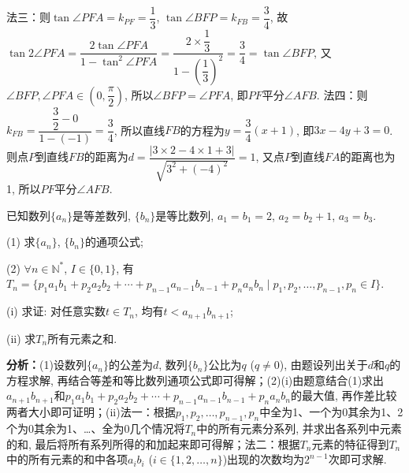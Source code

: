 \begin{question}[points=15]
\begin{solution}
法三：则$\tan\angle PFA = k_{PF} = \dfrac{1}{3}$, $\tan\angle BFP = k_{FB} = \dfrac{3}{4}$, 故$\tan 2\angle PFA = \dfrac{2\tan\angle PFA}{1 - \tan^2\angle PFA} = \dfrac{2 \times \dfrac{1}{3}}{1 - \left(\dfrac{1}{3}\right)^2} = \dfrac{3}{4} = \tan\angle BFP$, 又$\angle BFP, \angle PFA \in (0, \dfrac{\pi}{2})$, 所以$\angle BFP = \angle PFA$, 即$PF$平分$\angle AFB$.
法四：则$k_{FB} = \dfrac{\dfrac{3}{2} - 0}{1 - (-1)} = \dfrac{3}{4}$, 所以直线$FB$的方程为$y = \dfrac{3}{4}(x+1)$, 即$3x - 4y + 3 = 0$. 则点$P$到直线$FB$的距离为$d = \dfrac{|3 \times 2 - 4 \times 1 + 3|}{\sqrt{3^2 + (-4)^2}} = 1$, 又点$P$到直线$FA$的距离也为1, 所以$PF$平分$\angle AFB$.
\end{solution}
\end{question}

\begin{question}[points=15]
已知数列$\{a_n\}$是等差数列, $\{b_n\}$是等比数列, $a_1 = b_1 = 2$, $a_2 = b_2 + 1$, $a_3 = b_3$.

(1) 求$\{a_n\}$, $\{b_n\}$的通项公式;

(2) $\forall n \in \mathbb{N}^*$, $I \in \{0,1\}$, 有$T_n = \{p_1 a_1 b_1 + p_2 a_2 b_2 + \cdots + p_{n-1} a_{n-1} b_{n-1} + p_n a_n b_n \mid p_1, p_2, \ldots, p_{n-1}, p_n \in I\}$.

(i) 求证: 对任意实数$t \in T_n$, 均有$t < a_{n+1} b_{n+1}$;

(ii) 求$T_n$所有元素之和.
\begin{solution}

\textbf{分析：}(1)设数列$\{a_n\}$的公差为$d$, 数列$\{b_n\}$公比为$q$ ($q \neq 0$), 由题设列出关于$d$和$q$的方程求解, 再结合等差和等比数列通项公式即可得解；(2)(i)由题意结合(1)求出$a_{n+1}b_{n+1}$和$p_1 a_1 b_1 + p_2 a_2 b_2 + \cdots + p_{n-1} a_{n-1} b_{n-1} + p_n a_n b_n$的最大值, 再作差比较两者大小即可证明；(ii)法一：根据$p_1, p_2, \ldots, p_{n-1}, p_n$中全为1、一个为0其余为1、2个为0其余为1、…、全为0几个情况将$T_n$中的所有元素分系列, 并求出各系列中元素的和, 最后将所有系列所得的和加起来即可得解；法二：根据$T_n$元素的特征得到$T_n$中的所有元素的和中各项$a_i b_i$ ($i \in \{1,2,\ldots,n\}$)出现的次数均为$2^{n-1}$次即可求解.


\end{solution}
\end{question}
